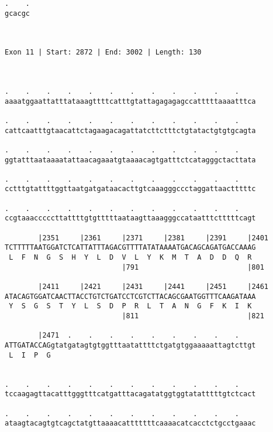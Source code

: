 \documentclass{article}
\begin{document}
\begin{Verbatim}
.    .
gcacgc
      
      
 
Exon 11 | Start: 2872 | End: 3002 | Length: 130



.    .    .    .    .    .    .    .    .    .    .    .    
aaaatggaattatttataaagttttcatttgtattagagagagccatttttaaaatttca
                                                            
.    .    .    .    .    .    .    .    .    .    .    .    
cattcaatttgtaacattctagaagacagattatcttctttctgtatactgtgtgcagta
                                                            
.    .    .    .    .    .    .    .    .    .    .    .    
ggtatttaataaaatattaacagaaatgtaaaacagtgatttctcatagggctacttata
                                                            
.    .    .    .    .    .    .    .    .    .    .    .    
cctttgtattttggttaatgatgataacacttgtcaaagggccctaggattaactttttc
                                                            
.    .    .    .    .    .    .    .    .    .    .    .    
ccgtaaacccccttattttgtgtttttaataagttaaagggccataatttctttttcagt
                                                            
        |2351     |2361     |2371     |2381     |2391     |2401
TCTTTTTAATGGATCTCATTATTTAGACGTTTTATATAAAATGACAGCAGATGACCAAAG
 L  F  N  G  S  H  Y  L  D  V  L  Y  K  M  T  A  D  D  Q  R 
                            |791                          |801
  
        |2411     |2421     |2431     |2441     |2451     |2461
ATACAGTGGATCAACTTACCTGTCTGATCCTCGTCTTACAGCGAATGGTTTCAAGATAAA
 Y  S  G  S  T  Y  L  S  D  P  R  L  T  A  N  G  F  K  I  K 
                            |811                          |821
  
        |2471  .    .    .    .    .    .    .    .    .    
ATTGATACCAGgtatgatagtgtggtttaatattttctgatgtggaaaaattagtcttgt
 L  I  P  G                                                 
                                                            
  
.    .    .    .    .    .    .    .    .    .    .    .    
tccaagagttacatttgggtttcatgatttacagatatggtggtatatttttgtctcact
                                                            
.    .    .    .    .    .    .    .    .    .    .    .    
ataagtacagtgtcagctatgttaaaacatttttttcaaaacatcacctctgcctgaaac
                                                            

\end{Verbatim}
\end{document}
